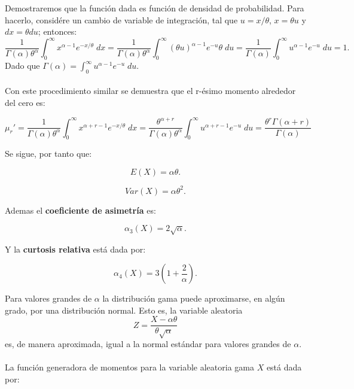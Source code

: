 Demostraremos que la función dada es función de densidad de probabilidad. Para hacerlo, considére un cambio de variable de integración, tal que $u=x/\theta$, $x=\theta u$ y $dx=\theta du$; entonces:
$$\dfrac{1}{\Gamma(\alpha)\theta^\alpha}\int_0^\infty x^{\alpha-1}e^{-x/\theta}\; dx = \dfrac{1}{\Gamma(\alpha)\theta^\alpha} \int_0^\infty \left(\theta u\right)^{\alpha-1} e^{-u}\theta\; du = \dfrac{1}{\Gamma(\alpha)}\int_0^\infty u^{\alpha -1 }e^{-u}\; du = 1.$$
Dado que $\Gamma(\alpha)=\displaystyle\int_0^{\infty} u^{\alpha -1 }e^{-u}\; du.$\\\\

Con este procedimiento similar se demuestra que el r-ésimo momento alrededor del cero es:

$$\mu_r' = \dfrac{1}{\Gamma(\alpha)\theta^\alpha}\int_0^\infty x^{\alpha+r-1}e^{-x/\theta}\; dx = \dfrac{\theta^{\alpha+r}}{\Gamma(\alpha)\theta^{\alpha}}\int_0^\infty u^{\alpha+r-1}e^{-u}\; du = \dfrac{\theta^r\Gamma(\alpha+r)}{\Gamma(\alpha)}$$

Se sigue, por tanto que:

\begin{tcolorbox}
    $$E(X)=\alpha\theta.$$
\end{tcolorbox}

\begin{tcolorbox}
    $$Var(X)=\alpha \theta^2.$$
\end{tcolorbox}

Ademas el \textbf{coeficiente de asimetría} es:
\begin{tcolorbox}
    $$\alpha_3(X)=2\sqrt{\alpha}.$$
\end{tcolorbox}

Y la \textbf{curtosis relativa} está dada por:
\begin{tcolorbox}
    $$\alpha_4(X)=3\left(1+\dfrac{2}{\alpha}\right).$$
\end{tcolorbox}

Para valores grandes de $\alpha$ la distribución gama puede aproximarse, en algún grado, por una distribución normal. Esto es, la variable aleatoria
$$Z=\dfrac{X-\alpha\theta}{\theta\sqrt{\alpha}}$$
es, de manera aproximada, igual a la normal estándar para valores grandes de $\alpha$.\\\\

La función generadora de momentos para la variable aleatoria gama $X$ está dada por:




